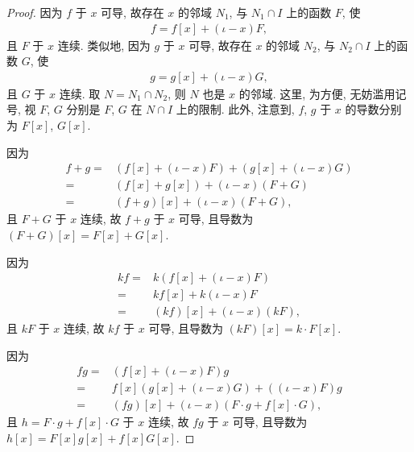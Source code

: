 \begin{proof}
    因为 $f$ 于 $x$ 可导,
    故存在 $x$ 的邻域 $N_1$, 与 $N_1 \cap I$ 上的函数 $F$,
    使
    \begin{align*}
        f = f[x] + (\iota - x)F,
    \end{align*}
    且 $F$ 于 $x$ 连续.
    类似地,
    因为 $g$ 于 $x$ 可导,
    故存在 $x$ 的邻域 $N_2$, 与 $N_2 \cap I$ 上的函数 $G$,
    使
    \begin{align*}
        g = g[x] + (\iota - x)G,
    \end{align*}
    且 $G$ 于 $x$ 连续.
    取 $N = N_1 \cap N_2$, 则 $N$ 也是 $x$ 的邻域.
    这里, 为方便, 无妨滥用记号,
    视 $F$, $G$ 分别是 $F$, $G$ 在 $N \cap I$ 上的限制.
    此外, 注意到,
    $f$, $g$ 于 $x$ 的导数分别为 $F[x]$, $G[x]$.

    因为
    \begin{align*}
        f + g
        = {} & (f[x] + (\iota - x)F) + (g[x] + (\iota - x)G) \\
        = {} & (f[x] + g[x]) + (\iota - x)(F + G)            \\
        = {} & (f + g)[x] + (\iota - x)(F + G),
    \end{align*}
    且 $F + G$ 于 $x$ 连续,
    故 $f + g$ 于 $x$ 可导,
    且导数为 $(F + G)[x] = F[x] + G[x]$.

    因为
    \begin{align*}
        kf
        = {} & k(f[x] + (\iota - x)F)     \\
        = {} & kf[x] + k(\iota - x)F      \\
        = {} & (kf)[x] + (\iota - x)(kF),
    \end{align*}
    且 $kF$ 于 $x$ 连续,
    故 $kf$ 于 $x$ 可导,
    且导数为 $(kF)[x] = k \cdot F[x]$.

    因为
    \begin{align*}
        fg
        = {} & (f[x] + (\iota - x)F)g                           \\
        = {} & f[x] (g[x] + (\iota - x)G) + ((\iota - x)F)g     \\
        = {} & (fg)[x] + (\iota - x)(F \cdot g + f[x] \cdot G),
    \end{align*}
    且
    $h = F \cdot g + f[x] \cdot G$
    于 $x$ 连续,
    故 $fg$ 于 $x$ 可导,
    且导数为 $h[x] = F[x]g[x] + f[x]G[x]$.


\end{proof}
